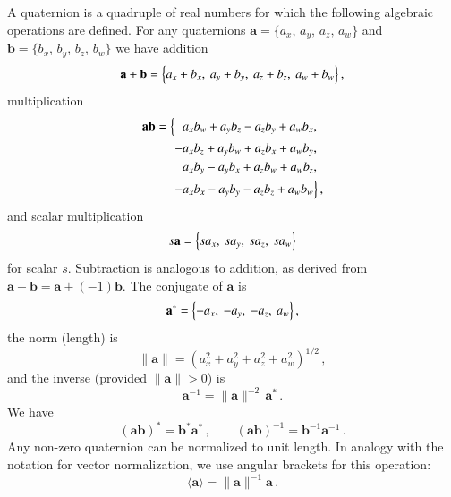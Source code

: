 \documentclass[structabstract]{aa}
\newcommand{\quat}[1]{\mathbf{#1}}
\begin{document}
A quaternion is a quadruple of real numbers for which the following algebraic
operations are defined. For any quaternions $\quat{a}=\bigl\{a_x,\,a_y,\,a_z,\,a_w\bigr\}$
and $\quat{b}=\bigl\{b_x,\,b_y,\,b_z,\,b_w\bigr\}$ we have addition
\begin{equation}\label{eq:quatadd}
\quat{a}+\quat{b}=\Bigl\{a_x+b_x,~a_y+b_y,~a_z+b_z,~a_w+b_w\Bigr\} \, ,
\end{equation}
multiplication
\begin{equation}\label{eq:quatmult}
\begin{split}
\quat{a}\quat{b}=\Bigl\{&\phantom{-}a_xb_w+a_yb_z-a_zb_y+a_wb_x,\\
&{-}a_xb_z+a_yb_w+a_zb_x+a_wb_y,\\
&\phantom{-}a_xb_y-a_yb_x+a_zb_w+a_wb_z,\\
&{-}a_xb_x-a_yb_y-a_zb_z+a_wb_w\Bigr\} \, ,
\end{split}
\end{equation}
and scalar multiplication
\begin{equation}\label{eq:quatscal}
s\quat{a}=\Bigl\{sa_x,~sa_y,~sa_z,~sa_w\Bigr\}
\end{equation}
for scalar $s$. Subtraction is analogous to addition, as
derived from $\quat{a}-\quat{b}=\quat{a}+(-1)\quat{b}$.
The conjugate of $\quat{a}$ is
\begin{equation}\label{eq:quatconj}
\quat{a}^*=\Bigl\{-a_x,~-a_y,~-a_z,~a_w\Bigr\} \, ,
\end{equation}
the norm (length) is
\begin{equation}\label{eq:quatnorm}
\lVert\quat{a}\rVert=(a_x^2+a_y^2+a_z^2+a_w^2)^{1/2} \, ,
\end{equation}
and the inverse (provided $\lVert\quat{a}\rVert>0$) is
\begin{equation}\label{eq:quatinv}
\quat{a}^{-1}=\lVert\quat{a}\rVert^{-2}\,\quat{a}^* \, .
\end{equation}
We have
\begin{equation}\label{eq:quatcom}
(\quat{a}\quat{b})^*=\quat{b}^*\quat{a}^* \, , \quad
\quad (\quat{a}\quat{b})^{-1}=\quat{b}^{-1}\quat{a}^{-1} \, .
\end{equation}
Any non-zero quaternion can be normalized to unit length. 
In analogy with the notation for vector normalization, we use 
angular brackets for this operation: 
\begin{equation}\label{eq:vecquatnorm}
\langle\quat{a}\rangle = \lVert\quat{a}\rVert^{-1}\quat{a} \, .
\end{equation}
\end{document}
